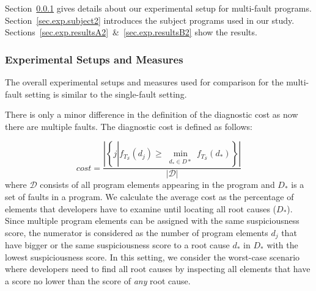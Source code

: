 Section~\ref{sec.exp.setup2} gives details about our experimental setup for multi-fault programs. Section~\ref{sec.exp.subject2} introduces the subject programs used in our study. Sections~\ref{sec.exp.resultsA2}~\&~\ref{sec.exp.resultsB2} show the results.

\subsubsection{Experimental Setups and Measures}\label{sec.exp.setup2}

The overall experimental setups and measures used for comparison for the multi-fault setting is similar to the single-fault setting. 

There is only a minor difference in the definition of the diagnostic cost as now there are multiple faults. The diagnostic cost is defined as follows:

\begin{equation}\label{equation.avgcost.multifault}
	cost = \dfrac{\left|  \left\{ j \left| \right.
           f_{T_{\mathcal{S}}}(d_j) \geq \min_{\substack{d_* \in D*}} f_{T_{\mathcal{S}}}(d_*) \right\} \right|}
           {\left|  \mathcal{D} \right|}
\end{equation}
where $\mathcal{D}$ consists of all program elements appearing in the program and $D_*$ is a set of faults in a program.
We calculate the average cost as the percentage of elements that developers have
to examine until locating all root causes ($D_*$). Since multiple
program elements can be assigned with the same suspiciousness score, the numerator
is considered as the number of program elements $d_j$ that have bigger or the
same suspiciousness score to a root cause $d_*$ in $D_*$ with the
lowest
suspiciousness
score. In this setting, we consider the worst-case scenario where developers need
to find all root causes by inspecting all elements that have a score no lower than the score of {\em any} root cause.



